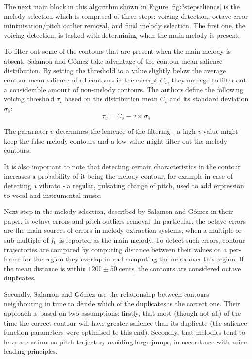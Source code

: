 The next main block in this algorithm shown in Figure \ref{fig:3stepsalience} is the melody selection which is comprised of three steps: voicing detection, octave error minimisation/pitch outlier removal, and final melody selection. The first one, the voicing detection, is tasked with determining when the main melody is present. 

To filter out some of the contours that are present when the main melody is absent, Salamon and G\'{o}mez take advantage of the contour mean salience distribution. By setting the threshold to a value slightly below the average contour mean salience of all contours in the excerpt $C_{s}$, they manage to filter out a considerable amount of non-melody contours. The authors define the following voicing threshold $\tau_{v}$ based on the distribution mean $C_{s}$ and its standard deviation $\sigma_{\overline{s}}$:
\begin{equation}
\tau_{v} = C_{s} - v \times \sigma_{\overline{s}}
\end{equation}

The parameter $v$ determines the lenience of the filtering - a high $v$ value might keep the false melody contours and a low value might filter out the melody contours.

It is also important to note that detecting certain characteristics in the contour increases a probability of it being the melody contour, for example in case of detecting a vibrato -  a regular, pulsating change of pitch, used to add expression to vocal and instrumental music. \cite{vibrato}

Next step in the melody selection, described by Salamon and G\'{o}mez in their paper, is octave errors and pitch outliers removal. In particular, the octave errors are the main sources of errors in melody extraction systems, when a multiple or sub-multiple of $f_{0}$ is reported as the main melody. To detect such errors, contour trajectories are compared by computing distance between their values on a per-frame for the region they overlap in and computing the mean over this region. If the mean distance is within $1200\pm50$ cents, the contours are considered octave duplicates.

Secondly, Salamon and G\'{o}mez use the relationship between contours neighbouring in time to decide which of the duplicates is the correct one. Their approach is based on two assumptions: firstly, that most (though not all) of the time the correct contour will have greater salience than its duplicate (the salience function parameters were optimised to this end). Secondly, that melodies tend to have a continuous pitch trajectory avoiding large jumps, in accordance with voice leading principles.

